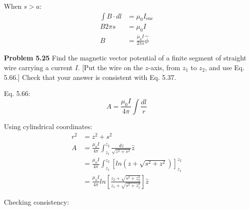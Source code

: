 \documentclass{article}
\begin{document}
When $s > a$:
\begin{equation*}
\begin{split}
	\int B \cdot dl & = \mu_0 I_{\text{enc}} \\
	B 2 \pi s & = \mu_0 I \\
	B & = \boxed{\frac{\mu_0 I}{2 \pi s} \hat{\phi}}
\end{split}
\end{equation*}

\textbf{Problem 5.25}
Find the magnetic vector potential of a finite segment of straight wire carrying a current $I$.
[Put the wire on the $z$-axis, from $z_1$ to $z_2$, and use Eq. 5.66.]
Check that your answer is consistent with Eq. 5.37.

Eq. 5.66:
$$A = \frac{\mu_0 I}{4 \pi} \int \frac{dl}{r}$$

Using cylindrical coordinates:
\begin{equation*}
\begin{split}
	r^2 & = z^2 + s^2 \\
	A & = \frac{\mu_0 I}{4 \pi} \int_{z_1}^{z_2} \frac{dz}{\sqrt{z^2 + s^2}} \hat{z} \\
	& = \frac{\mu_0 I}{4 \pi} \int_{z_1}^{z_2} [ln(z + \sqrt{s^2 + z^2})]_{z_1}^{z_2} \\
	& = \boxed{\frac{\mu_0 I}{4 \pi} ln[\frac{z_2 + \sqrt{s^2 + z_2^2}}{z_1 + \sqrt{s^2 + z_1^2}}] \hat{z}}
\end{split}
\end{equation*}

Checking consistency:
\end{document}
